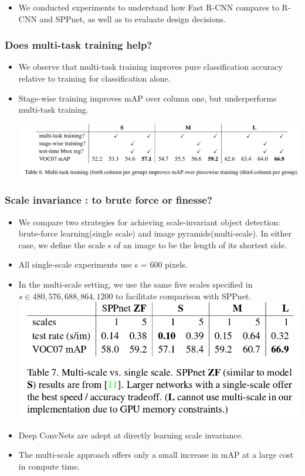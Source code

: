\documentclass[11pt]{article}
\begin{document}
\begin{itemize}
\item We conducted experiments to understand how Fast R-CNN compares to R-CNN and SPPnet, as well 
     as to evaluate design decisions.
\end{itemize}
   
\subsubsection{Does multi-task training help?}
\label{sec-1-4-1}


\begin{itemize}
\item We observe that multi-task training improves pure classification accuracy relative to
      training for classification alone.
\item Stage-wise training improves mAP over column one, but underperforms multi-task training.
    
      \includegraphics[width=.9\linewidth]{./pic_fast_rcnn/table6.png}
\end{itemize}
\subsubsection{Scale invariance : to brute force or finesse?}
\label{sec-1-4-2}


\begin{itemize}
\item We compare two strategies for achieving scale-invariant object detection:
      brute-force learning(single scale) and image pyramids(multi-scale). In either
      case, we define the scale s of an image to be the length of its shortest side.
\item All single-scale experiments use s = 600 pixels.
\item In the multi-scale setting, we use the same five scales specified in \footnotemark[4]
      $s\in{{480,576,688,864,1200}}$ to facilitate comparison with SPPnet.
      \includegraphics[width=.9\linewidth]{./pic_fast_rcnn/table7.png}
\item Deep ConvNets are adept at directly learning scale invariance.
\item The multi-scale approach offers only a small increase in mAP at a large cost
      in compute time.
\end{itemize}
\end{document}
